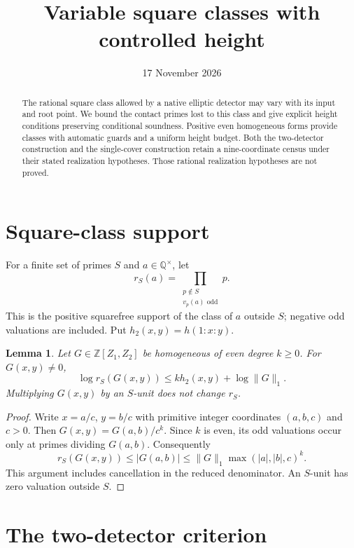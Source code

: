 \documentclass[11pt,a4paper]{article}
\title{Variable square classes with controlled height}
\author{}\date{17 November 2026}
\newtheorem{lemma}[theorem]{Lemma}
\newcommand{\Q}{\mathbb Q}\newcommand{\Z}{\mathbb Z}
\begin{document}
\maketitle
\begin{abstract}
The rational square class allowed by a native elliptic detector may
vary with its input and root point. We bound the contact primes lost
to this class and give explicit height conditions preserving
conditional soundness. Positive even homogeneous forms provide
classes with automatic guards and a uniform height budget. Both
the two-detector construction and the single-cover construction
retain a nine-coordinate census under their stated realization
hypotheses. Those rational realization hypotheses are not proved.
\end{abstract}

\section{Square-class support}

For a finite set of primes $S$ and $a\in\Q^\times$, let
\[
 r_S(a)=\prod_{\substack{p\notin S\\v_p(a)\text{ odd}}}p.
\]
This is the positive squarefree support of the class of $a$ outside
$S$; negative odd valuations are included. Put
$h_2(x,y)=h(1:x:y)$.

\begin{lemma}\label{lem:budget}
Let $G\in\Z[Z_1,Z_2]$ be homogeneous of even degree $k\ge0$.
For $G(x,y)\ne0$,
\[
 \log r_S(G(x,y))\le k h_2(x,y)+\log\|G\|_1.
\]
Multiplying $G(x,y)$ by an $S$-unit does not change $r_S$.
\end{lemma}
\begin{proof}
Write $x=a/c$, $y=b/c$ with primitive integer coordinates
$(a,b,c)$ and $c>0$. Then $G(x,y)=G(a,b)/c^k$.
Since $k$ is even, its odd valuations occur only at primes
dividing $G(a,b)$. Consequently
\[
 r_S(G(x,y))\le |G(a,b)|
 \le\|G\|_1\max(|a|,|b|,c)^k.
\]
This argument includes cancellation in the reduced denominator.
An $S$-unit has zero valuation outside $S$.
\end{proof}

\section{The two-detector criterion}
\end{document}
